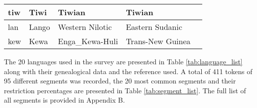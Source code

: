 \begin{table}[h]
{\begin{tabular}{|l|l|l|l|l|}
tiw  & Tiwi                                                          & Tiwian                                                                  & Tiwian               &     \citet{osborneTiwiLanguageGrammar1974}      \\ \hline
lan  & Lango                                                         & Western Nilotic                                                         & Eastern Sudanic      &     \citet{noonanGrammarLango1992}      \\ \hline
kew  & Kewa                                                          & Enga\_Kewa-Huli                                                         & Trans-New Guinea     &     \citet{franklinGrammarKewaNew1971} \\ \hline
\end{tabular}}
\end{table}

The 20 languages used in the survey are presented in Table \ref{tab:language_list} along with their genealogical data and the reference used. 
A total of 411 tokens of 95 different segments was recorded, the 20 most common segments and their restriction percentages are presented in Table \ref{tab:segment_list}. The full list of all segments is provided in Appendix B. 

